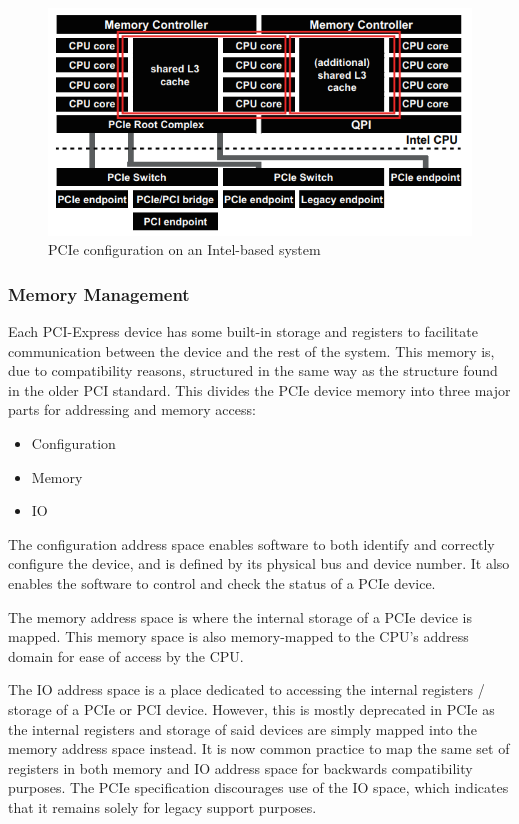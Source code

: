 \begin{figure}
\includegraphics[width = \linewidth]{figures/PCIE-topology}
\caption{PCIe configuration on an Intel-based system\cite{nakamura_thorough_2017}}
\label{fig:topology}
\end{figure}

\subsubsection{Memory Management}
\label{sec:memory}

Each PCI-Express device has some built-in storage and registers to facilitate communication between the device and the rest of the system. This memory is, due to compatibility reasons, structured in the same way as the structure found in the older PCI standard. This divides the PCIe device memory into three major parts for addressing and memory access:\cite{jackson_pci_2012}

\begin{itemize}
\item Configuration
\item Memory
\item IO
\end{itemize}

The configuration address space enables software to both identify and correctly configure the device, and is defined by its physical bus and device number.\cite{oracle_inc_pci_nodate} It also enables the software to control and check the status of a PCIe device. \cite{jackson_pci_2012}

The memory address space is where the internal storage of a PCIe device is mapped.\cite{jackson_pci_2012} This memory space is also memory-mapped to the CPU's address domain for ease of access by the CPU.\cite{oracle_inc_pci_nodate}

The IO address space is a place dedicated to accessing the internal registers / storage of a PCIe or PCI device. However, this is mostly deprecated in PCIe as the internal registers and storage of said devices are simply mapped into the memory address space instead. It is now common practice to map the same set of registers in both memory and IO address space for backwards compatibility purposes. The PCIe specification discourages use of the IO space, which indicates that it remains solely for legacy support purposes.\cite{jackson_pci_2012}

